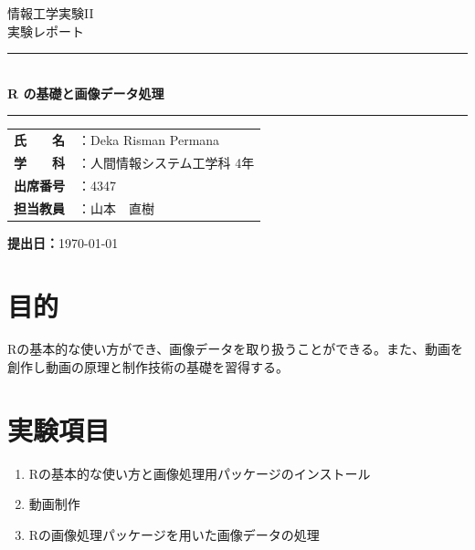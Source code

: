 \documentclass[12pt,a4paper]{ltjsarticle}
\title{}
\date{}
\author{}
\newcommand{\HRule}{\rule{\linewidth}{0.5mm}}
\begin{document}

\begin{titlepage}
  \thispagestyle{titlepage}
  \centering
  \vspace*{2cm}

  {\large 情報工学実験II}\\[0.5em]
  {\large 実験レポート}\\[2em]

  \HRule{}\\[1em]
  {\LARGE \textbf{R の基礎と画像データ処理}}\\[0.5em]
  \HRule{}

  \vspace{3cm}

  \begin{tabular}{rl}
    \textbf{氏　　名} & ：Deka Risman Permana \\[0.4em]
    \textbf{学　　科} & ：人間情報システム工学科 4年 \\[0.4em]
    \textbf{出席番号} & ：4347 \\[0.4em]
    \textbf{担当教員} & ：山本　直樹 \\
  \end{tabular}

  \vfill

  \textbf{提出日：}\today

\end{titlepage}

\newpage
\thispagestyle{frontmatter}
\tableofcontents

\newpage
{}
\setcounter{page}{1}


\section{目的}\label{sec:objective}
Rの基本的な使い方ができ、画像データを取り扱うことができる。また、動画を創作し動画の原理と制作技術の基礎を習得する。

\section{実験項目}\label{sec:experiment}
\begin{enumerate}[label = (\arabic*)]
  \item Rの基本的な使い方と画像処理用パッケージのインストール
  \item 動画制作
  \item Rの画像処理パッケージを用いた画像データの処理
\end{enumerate}
\end{document}

